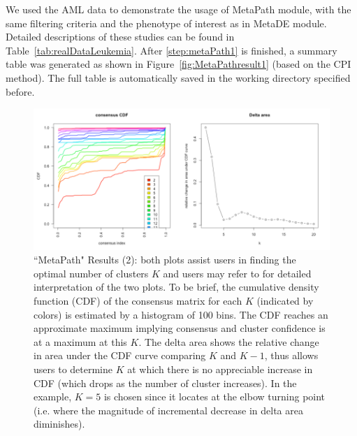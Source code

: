 We used the AML data to demonstrate the usage of MetaPath module,
with the same filtering criteria and the phenotype of interest as in MetaDE module.
Detailed descriptions of these studies can be found in Table~\ref{tab:realDataLeukemia}. 
After \ref{step:metaPath1} is finished, a summary table was generated as shown in Figure~\ref{fig:MetaPathresult1} (based on the CPI method). 
The full table is automatically saved in the working directory specified before.  

\begin{figure}[H]
\begin{center}
\includegraphics[scale=0.5]{./figure/metaPath/metaPathresult2.png}
\caption{``MetaPath" Results (2):
both plots assist users in finding the optimal number of clusters $K$ and users may refer to \cite{monti2003consensus} for detailed interpretation of the two plots. 
To be brief, the cumulative density function (CDF) of the consensus matrix for each $K$ (indicated by colors) is estimated by a histogram of 100 bins. 
The CDF reaches an approximate maximum implying consensus and cluster confidence is at a maximum at this $K$. 
The delta area shows the relative change in area under the CDF curve comparing $K$ and $K - 1$, thus allows users to determine $K$ at which there is no appreciable increase in CDF (which drops as the number of cluster increases).
In the example, $K=5$ is chosen since it locates at the elbow turning point (i.e. where the magnitude of incremental decrease in delta area diminishes).
}
\label{fig:MetaPathresult2}
\end{center}
\end{figure}

